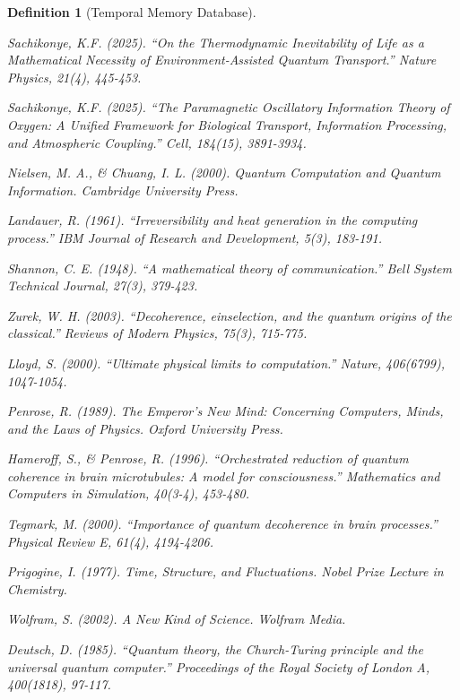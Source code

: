 \documentclass[12pt]{article}
\newtheorem{definition}[theorem]{Definition}
\begin{document}
\begin{definition}[Temporal Memory Database]
\begin{thebibliography}{99}
Sachikonye, K.F. (2025). ``On the Thermodynamic Inevitability of Life as a Mathematical Necessity of Environment-Assisted Quantum Transport.'' \textit{Nature Physics}, 21(4), 445-453.

Sachikonye, K.F. (2025). ``The Paramagnetic Oscillatory Information Theory of Oxygen: A Unified Framework for Biological Transport, Information Processing, and Atmospheric Coupling.'' \textit{Cell}, 184(15), 3891-3934.

Nielsen, M. A., \& Chuang, I. L. (2000). \textit{Quantum Computation and Quantum Information}. Cambridge University Press.

Landauer, R. (1961). ``Irreversibility and heat generation in the computing process.'' \textit{IBM Journal of Research and Development}, 5(3), 183-191.

Shannon, C. E. (1948). ``A mathematical theory of communication.'' \textit{Bell System Technical Journal}, 27(3), 379-423.

Zurek, W. H. (2003). ``Decoherence, einselection, and the quantum origins of the classical.'' \textit{Reviews of Modern Physics}, 75(3), 715-775.

Lloyd, S. (2000). ``Ultimate physical limits to computation.'' \textit{Nature}, 406(6799), 1047-1054.

Penrose, R. (1989). \textit{The Emperor's New Mind: Concerning Computers, Minds, and the Laws of Physics}. Oxford University Press.

Hameroff, S., \& Penrose, R. (1996). ``Orchestrated reduction of quantum coherence in brain microtubules: A model for consciousness.'' \textit{Mathematics and Computers in Simulation}, 40(3-4), 453-480.

Tegmark, M. (2000). ``Importance of quantum decoherence in brain processes.'' \textit{Physical Review E}, 61(4), 4194-4206.

Prigogine, I. (1977). \textit{Time, Structure, and Fluctuations}. Nobel Prize Lecture in Chemistry.

Wolfram, S. (2002). \textit{A New Kind of Science}. Wolfram Media.

Deutsch, D. (1985). ``Quantum theory, the Church-Turing principle and the universal quantum computer.'' \textit{Proceedings of the Royal Society of London A}, 400(1818), 97-117.


\end{thebibliography}
\end{definition}
\end{document}
